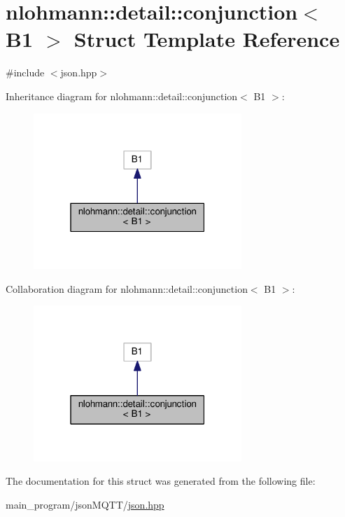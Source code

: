 \hypertarget{structnlohmann_1_1detail_1_1conjunction_3_01_b1_01_4}{}\section{nlohmann\+:\+:detail\+:\+:conjunction$<$ B1 $>$ Struct Template Reference}
\label{structnlohmann_1_1detail_1_1conjunction_3_01_b1_01_4}


{\ttfamily \#include $<$json.\+hpp$>$}



Inheritance diagram for nlohmann\+:\+:detail\+:\+:conjunction$<$ B1 $>$\+:
\nopagebreak
\begin{figure}[H]
\begin{center}
\leavevmode
\includegraphics[width=223pt]{structnlohmann_1_1detail_1_1conjunction_3_01_b1_01_4__inherit__graph}
\end{center}
\end{figure}


Collaboration diagram for nlohmann\+:\+:detail\+:\+:conjunction$<$ B1 $>$\+:
\nopagebreak
\begin{figure}[H]
\begin{center}
\leavevmode
\includegraphics[width=223pt]{structnlohmann_1_1detail_1_1conjunction_3_01_b1_01_4__coll__graph}
\end{center}
\end{figure}


The documentation for this struct was generated from the following file\+:\begin{DoxyCompactItemize}
\item 
main\+\_\+program/json\+M\+Q\+T\+T/\hyperlink{json_8hpp}{json.\+hpp}\end{DoxyCompactItemize}
